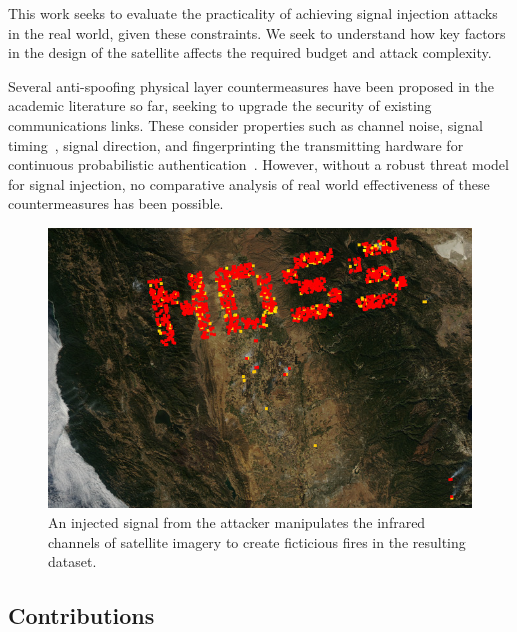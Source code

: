 This work seeks to evaluate the practicality of achieving signal injection attacks in the real world, given these constraints.
We seek to understand how key factors in the design of the satellite affects the required budget and attack complexity.


Several anti-spoofing physical layer countermeasures have been proposed in the academic literature so far, seeking to upgrade the security of existing communications links.
These consider properties such as channel noise, signal timing~\cite{jedermann2021orbit}, signal direction, and fingerprinting the transmitting hardware for continuous probabilistic authentication~\cite{foruhandeh2020spotr,oligeri2020past,borio2016gnss,qiu2022robust}.
However, without a robust threat model for signal injection, no comparative analysis of real world effectiveness of these countermeasures has been possible. %

\begin{figure}
    \includegraphics[width=\columnwidth]{diagrams/injection/pixels_800_140.jpg}
    \caption{An injected signal from the attacker manipulates the infrared channels of satellite imagery to create ficticious fires in the resulting dataset.}
    \label{fig:location-injection}
\end{figure}


\subsection{Contributions}

